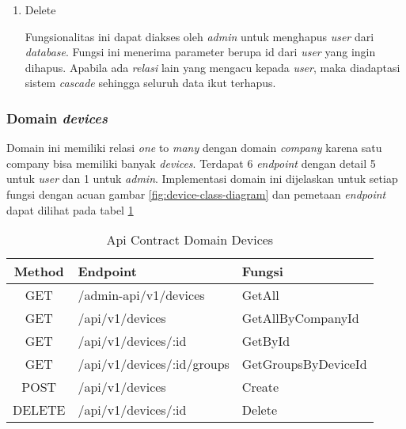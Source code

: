 \begin{enumerate}
        Fungsionalitas ini menerima masukan berupa json dengan \textit{field} \textit{name}, \textit{email}, \textit{password}, serta \textit{company\textunderscore id} dari \textit{requester}. Seluruh \textit{field} tersebut digunakan untuk membuat objek user pada \textit{database}. Pada fungsi ini dilakukan pengecekan apakah \textit{email} valid dan \textit{unique}. Selain itu ada validasi \textit{company\textunderscore id} agar dipastikan bahwa \textit{user} benar terdaftar ke \textit{company} yang sesuai. Apabila validasi tidak berhasil maka dikeluarkan pesan error, namun jika semua berhasil dilewati maka dikembalikan \textit{response} berupa \textit{user} yang telah dibuat pada \textit{database}.

  \item Delete

        Fungsionalitas ini dapat diakses oleh \textit{admin} untuk menghapus \textit{user} dari \textit{database}. Fungsi ini menerima parameter berupa id dari \textit{user} yang ingin dihapus. Apabila ada \textit{relasi} lain yang mengacu kepada \textit{user}, maka diadaptasi sistem \textit{cascade} sehingga seluruh data ikut terhapus.

\end{enumerate}

\subsubsection{Domain \textit{devices}}

Domain ini memiliki relasi \textit{one} to \textit{many} dengan domain \textit{company} karena satu company bisa memiliki banyak \textit{devices}. Terdapat 6 \textit{endpoint} dengan detail 5 untuk \textit{user} dan 1 untuk \textit{admin}. Implementasi domain ini dijelaskan untuk setiap fungsi dengan acuan gambar \ref{fig:device-class-diagram} dan pemetaan \textit{endpoint} dapat dilihat pada tabel \ref{tab:api-contract-domain-device}

\bgroup
\begin{table}[ht]
  \caption{Api Contract Domain Devices}
  \label{tab:api-contract-domain-device}
  \def\arraystretch{1.7}
  \centering
  \begin{tabular}{|c|p{6cm}|p{4cm}|}
    \hline
    Method & Endpoint                   &
    Fungsi                                                    \\
    \hline
    GET    & /admin-api/v1/devices      & GetAll              \\
    \hline
    GET    & /api/v1/devices            & GetAllByCompanyId   \\
    \hline
    GET    & /api/v1/devices/:id        & GetById             \\
    \hline
    GET    & /api/v1/devices/:id/groups & GetGroupsByDeviceId \\
    \hline
    POST   & /api/v1/devices            & Create              \\
    \hline
    DELETE & /api/v1/devices/:id        & Delete              \\
    \hline
  \end{tabular}
\end{table}
\egroup

